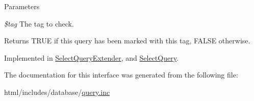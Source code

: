 \begin{DoxyParams}{Parameters}
\item[{\em \$tag}]The tag to check.\end{DoxyParams}
\begin{DoxyReturn}{Returns}
TRUE if this query has been marked with this tag, FALSE otherwise. 
\end{DoxyReturn}


Implemented in \hyperlink{classSelectQueryExtender_ab9dd51674086089c405126e6508e232d}{SelectQueryExtender}, and \hyperlink{classSelectQuery_a1d85219dc7e79cbff77c0b86a5861ddc}{SelectQuery}.

The documentation for this interface was generated from the following file:\begin{DoxyCompactItemize}
\item 
html/includes/database/\hyperlink{query_8inc}{query.inc}\end{DoxyCompactItemize}
